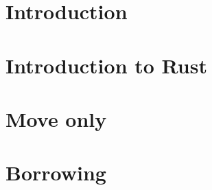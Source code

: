 \documentclass{report}
\begin{document}
\maketitle

%

\tableofcontents

\chapter*{Introduction}


\chapter{Introduction to Rust}


\chapter{Move only}


\chapter{Borrowing}


%

%

%

%

%
\end{document}
